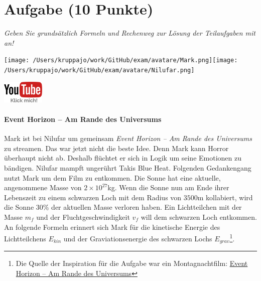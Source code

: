 \documentclass[a4paper, 9pt]{scrartcl}\usepackage[]{graphicx}\usepackage[]{xcolor}
\begin{document}
\section{Aufgabe \hfill (10 Punkte)}

\textit{Geben Sie grundsätzlich Formeln und Rechenweg zur Lösung der Teilaufgaben mit an!} \\[1Ex]
 

 
\ifcollection
\begin{flushright}
\tiny\vspace{-3Ex}
\textbf{\examinhaltstart}
\exammodulemathstat
\vspace{-4Ex}
\end{flushright}
\begin{minipage}[t]{0.5\textwidth}
\texttt{[image: /Users/kruppajo/work/GitHub/exam/avatare/Mark.png]}\hspace{-4mm}\texttt{[image: /Users/kruppajo/work/GitHub/exam/avatare/Nilufar.png]}
\end{minipage}
\begin{minipage}[t]{0.5\textwidth}
\hfill
\href{https://youtu.be/q-qYK4Chslg}{\includegraphics[width = 2cm]{img/youtube}}
\end{minipage}
\fi



\ifcollection
\paragraph{Event Horizon -- Am Rande des Universums}
\fi



Mark ist bei Nilufar um gemeinsam \textit{Event Horizon -- Am Rande des Universums} zu streamen. Das war jetzt nicht die beste Idee. Denn Mark kann Horror überhaupt nicht ab. Deshalb flüchtet er sich in Logik um seine Emotionen zu bändigen. Nilufar mampft ungerührt Takis Blue Heat. Folgenden Gedankengang nutzt Mark um dem Film zu entkommen. Die Sonne hat eine aktuelle, angenommene Masse von $\ensuremath{2\times 10^{27}}$kg. Wenn die Sonne nun am Ende ihrer Lebenszeit zu einem schwarzen Loch mit dem Radius von $3500$m kollabiert, wird die Sonne $30$\% der aktuellen Masse verloren haben. Ein Lichtteilchen mit der Masse $m_f$ und der Fluchtgeschwindigkeit $v_f$ will dem schwarzen Loch entkommen. An folgende Formeln erinnert sich Mark für die kinetische Energie des Lichtteilchens $E_{kin}$ und der Graviationsenergie des schwarzen Lochs $E_{grav}$\footnote{Die Quelle der Inspiration für die Aufgabe war ein Montagnachtfilm: \href{https://de.wikipedia.org/wiki/Event_Horizon_–_Am_Rande_des_Universums}{Event Horizon – Am Rande des Universums}}.
\end{document}
